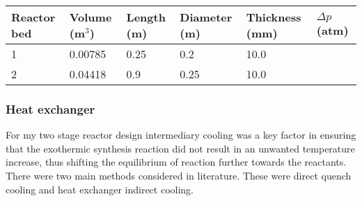 {\begin{table}[!htbp]
\begin{center}
\begin{tabular}{ |p{2.3cm}|p{2.3cm}|p{2.3cm}|p{2.3cm}|p{2.7cm}|p{2.3cm}| }
				Reactor bed & Volume (m$^3$)& Length (m)&Diameter (m)&Thickness (mm)&$\Delta p$ (atm)\\
				\hline
				 1&0.00785 & 0.25 &0.2 &10.0& \\
				\hline
				 2&0.04418 & 0.9 &0.25 &10.0&\\
			
				\hline
			\end{tabular}
	\end{center}
\end{table}
\subsubsection{Heat exchanger}

For my two stage reactor design intermediary cooling was a key factor in ensuring that the exothermic synthesis reaction did not result in an unwanted temperature increase, thus shifting the equilibrium of reaction further towards the reactants. There were two main methods considered in literature. These were direct quench cooling and heat exchanger indirect cooling.

}
